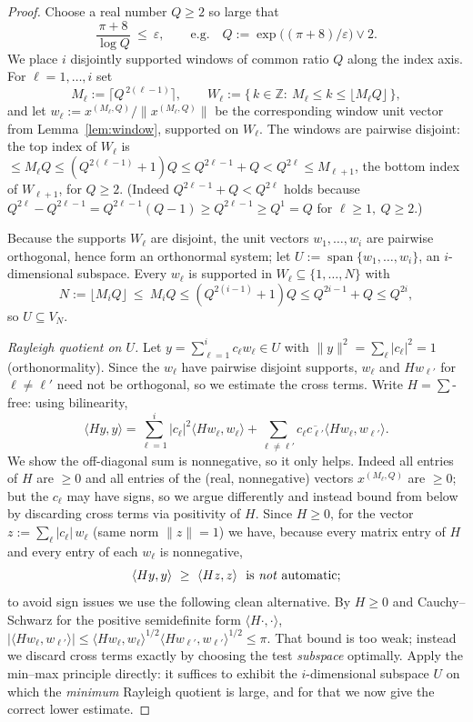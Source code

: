 \documentclass[12pt]{article}
\theoremstyle{remark}
\begin{document}
\begin{proof}
Choose a real number $Q\ge2$ so large that
\begin{equation}\label{eq:Qchoice}
\frac{\pi+8}{\log Q}\ \le\ \varepsilon,\qquad\text{e.g.}\quad Q:=\exp\!\bigl((\pi+8)/\varepsilon\bigr)\vee 2 .
\end{equation}
We place $i$ disjointly supported windows of common ratio $Q$ along the index axis. For
$\ell=1,\dots,i$ set
\[
M_\ell:=\bigl\lceil Q^{\,2(\ell-1)}\bigr\rceil,\qquad
W_\ell:=\{\,k\in\mathbb Z:\ M_\ell\le k\le \lfloor M_\ell Q\rfloor\,\},
\]
and let $w_\ell:=x^{(M_\ell,Q)}/\|x^{(M_\ell,Q)}\|$ be the corresponding window unit vector from
Lemma~\ref{lem:window}, supported on $W_\ell$. The windows are pairwise disjoint: the top index of
$W_\ell$ is $\le M_\ell Q\le (Q^{2(\ell-1)}+1)Q\le Q^{2\ell-1}+Q< Q^{2\ell}\le M_{\ell+1}$, the
bottom index of $W_{\ell+1}$, for $Q\ge2$. (Indeed $Q^{2\ell-1}+Q<Q^{2\ell}$ holds because
$Q^{2\ell}-Q^{2\ell-1}=Q^{2\ell-1}(Q-1)\ge Q^{2\ell-1}\ge Q^{1}=Q$ for $\ell\ge1,\ Q\ge2$.)

Because the supports $W_\ell$ are disjoint, the unit vectors $w_1,\dots,w_i$ are pairwise
orthogonal, hence form an orthonormal system; let $U:=\operatorname{span}\{w_1,\dots,w_i\}$, an
$i$-dimensional subspace. Every $w_\ell$ is supported in $W_\ell\subseteq\{1,\dots,N\}$ with
\[
N:=\lfloor M_i Q\rfloor\ \le\ M_iQ\le (Q^{2(i-1)}+1)Q\le Q^{2i-1}+Q\le Q^{2i},
\]
so $U\subseteq V_N$.

\emph{Rayleigh quotient on $U$.} Let $y=\sum_{\ell=1}^i c_\ell w_\ell\in U$ with $\|y\|^2=
\sum_\ell|c_\ell|^2=1$ (orthonormality). Since the $w_\ell$ have pairwise disjoint supports,
$w_\ell$ and $Hw_{\ell'}$ for $\ell\ne\ell'$ need not be orthogonal, so we estimate the cross
terms. Write $H=\sum$-free: using bilinearity,
\[
\langle Hy,y\rangle=\sum_{\ell=1}^i|c_\ell|^2\langle Hw_\ell,w_\ell\rangle
+\sum_{\ell\ne\ell'}c_\ell\overline{c_{\ell'}}\langle Hw_\ell,w_{\ell'}\rangle .
\]
We show the off-diagonal sum is nonnegative, so it only helps. Indeed all entries of $H$ are
$\ge0$ and all entries of the (real, nonnegative) vectors $x^{(M_\ell,Q)}$ are $\ge0$; but the
$c_\ell$ may have signs, so we argue differently and instead bound from below by discarding cross
terms via positivity of $H$. Since $H\ge0$, for the vector
$z:=\sum_\ell |c_\ell|\, w_\ell$ (same norm $\|z\|=1$) we have, because every matrix entry of $H$
and every entry of each $w_\ell$ is nonnegative,
\[
\langle Hy,y\rangle\ \ge\ \langle Hz,z\rangle\ \text{ is \emph{not} automatic;}
\]
to avoid sign issues we use the following clean alternative. By $H\ge0$ and Cauchy--Schwarz for
the positive semidefinite form $\langle H\cdot,\cdot\rangle$,
$|\langle Hw_\ell,w_{\ell'}\rangle|\le\langle Hw_\ell,w_\ell\rangle^{1/2}
\langle Hw_{\ell'},w_{\ell'}\rangle^{1/2}\le\pi$. That bound is too weak; instead we discard cross
terms exactly by choosing the test \emph{subspace} optimally. Apply the min--max principle
directly: it suffices to exhibit the $i$-dimensional subspace $U$ on which the \emph{minimum}
Rayleigh quotient is large, and for that we now give the correct lower estimate.


\end{proof}
\end{document}
